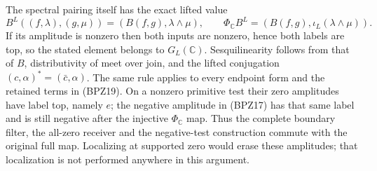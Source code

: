 The spectral pairing itself has the exact lifted value
\begin{equation}\tag{BPZ22}
 B^L((f,\lambda),(g,\mu))=(B(f,g),\lambda\wedge\mu),\qquad
 \Phi_{\mathbb C}B^L
       =(B(f,g),\iota_L(\lambda\wedge\mu)).
\end{equation}
If its amplitude is nonzero then both inputs are nonzero, hence both
labels are top, so the stated element belongs to $G_L(\mathbb C)$.
Sesquilinearity follows from that of $B$, distributivity of meet over
join, and the lifted conjugation $(c,\alpha)^*=(\bar c,\alpha)$.
The same rule applies to every endpoint form and the retained terms
in (BPZ19). On a nonzero primitive test their zero amplitudes have label
top, namely $e$; the negative amplitude in (BPZ17) has that same label
and is still negative after the injective $\Phi_{\mathbb C}$ map.
Thus the complete boundary filter, the all-zero receiver and the
negative-test construction commute with the original full map.
Localizing at supported zero would erase these amplitudes; that
localization is not performed anywhere in this argument.
